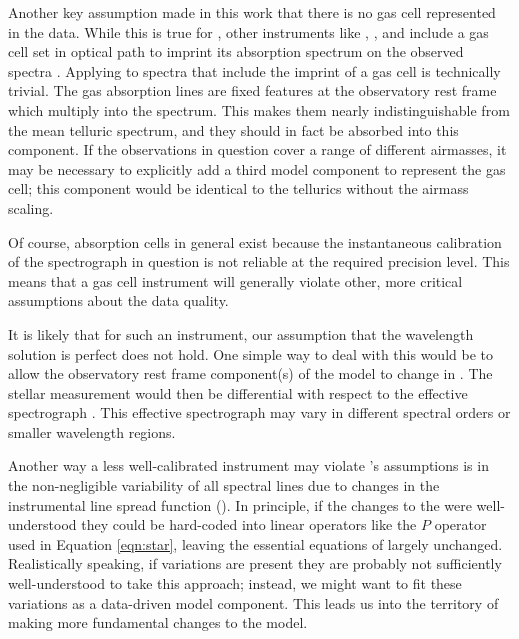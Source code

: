 \documentclass[modern]{aastex62}
\begin{document}
{Another key assumption made in this work that there is no gas cell represented in the data. 
While this is true for \HARPS, other instruments like , , and  include a gas cell set in optical path to imprint its absorption spectrum on the observed spectra . 
Applying \wobble to spectra that include the imprint of a gas cell is technically trivial. 
The gas absorption lines are fixed features at the observatory rest frame which multiply into the spectrum. 
This makes them nearly indistinguishable from the mean telluric spectrum, and they should in fact be absorbed into this component. 
If the observations in question cover a range of different airmasses, it may be necessary to explicitly add a third model component to represent the gas cell; this component would be identical to the tellurics without the airmass scaling. 

Of course, absorption cells in general exist because the instantaneous calibration of the spectrograph in question is not reliable at the required \RV precision level. 
This means that a gas cell instrument will generally violate other, more critical assumptions about the data quality. 

It is likely that for such an instrument, our assumption that the wavelength solution is perfect does not hold. 
One simple way to deal with this would be to allow the observatory rest frame component(s) of the model to change in \RV. 
The stellar \RV measurement would then be differential with respect to the effective spectrograph \RV. 
This effective spectrograph \RV may vary in different spectral orders or smaller wavelength regions.  

Another way a less well-calibrated instrument may violate \wobble's assumptions is in the non-negligible variability of all spectral lines due to changes in the instrumental line spread function (\LSF). 
In principle, if the changes to the \LSF were well-understood they could be hard-coded into linear operators like the $P$ operator used in Equation \ref{eqn:star}, leaving the essential equations of \wobble largely unchanged. 
Realistically speaking, if \LSF variations are present they are probably not sufficiently well-understood to take this approach; instead, we might want to fit these variations as a data-driven model component. 
This leads us into the territory of making more fundamental changes to the \wobble model.

}
\end{document}
